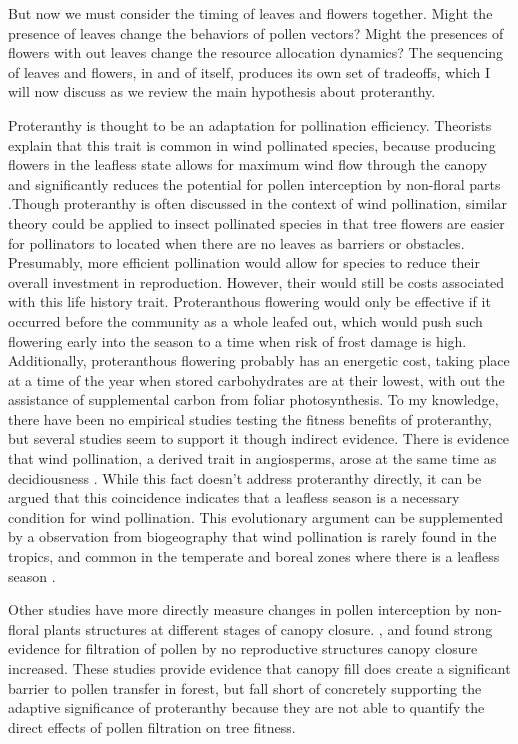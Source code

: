 \documentclass{article}\usepackage[]{graphicx}\usepackage[]{color}
\begin{document}
But now we must consider the timing of leaves and flowers together. Might the presence of leaves change the behaviors of pollen vectors? Might the presences of flowers with out leaves change the resource allocation dynamics? The sequencing of leaves and flowers, in and of itself, produces its own set of tradeoffs, which I will now discuss as we review the main hypothesis about proteranthy.
\par Proteranthy is thought to be an adaptation for pollination efficiency. Theorists explain that this trait is common in wind pollinated species, because producing flowers in the leafless state allows for maximum wind flow through the canopy and significantly reduces the potential for pollen interception by non-floral parts \citep{Rathcke1985, Whitehead1969}.Though proteranthy is often discussed in the context of wind pollination, similar theory could be applied to insect pollinated species in that tree flowers are easier for pollinators to located when there are no leaves as barriers or obstacles. Presumably, more efficient pollination would allow for species to reduce their overall investment in reproduction. However, their would still be costs associated with this life history trait. Proteranthous flowering would only be effective if it occurred before the community as a whole leafed out, which would push such flowering early into the season to a time when risk of frost damage is high. Additionally, proteranthous flowering probably has an energetic cost, taking place at a time of the year when stored carbohydrates are at their lowest, with out the assistance of supplemental carbon from foliar photosynthesis\citep{Aschan2003}.
To my knowledge, there have been no empirical studies testing the fitness benefits of proteranthy, but several studies seem to support it though indirect evidence. There is evidence that wind pollination, a derived trait in angiosperms, arose at the same time as decidiousness \citep{Whitehead1969}. While this fact doesn't address proteranthy directly, it can be argued that this coincidence indicates that a leafless season is a necessary condition for wind pollination. This evolutionary argument can be supplemented by a observation from biogeography that wind pollination is rarely found in the tropics, and common in the temperate and boreal zones where there is a leafless season \citep{Whitehead1969}.
\par Other studies have more directly measure changes in pollen interception by non-floral plants structures at different stages of canopy closure. \citep {Tauber1967, Milleron2012}, and found strong evidence for filtration of pollen by no reproductive structures canopy closure increased. These studies provide evidence that canopy fill does create a significant barrier to pollen transfer in forest, but fall short of concretely supporting the adaptive significance of proteranthy because they are not able to quantify the direct effects of pollen filtration on tree fitness.
\end{document}
